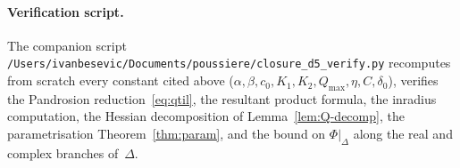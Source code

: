 \documentclass[11pt,a4paper]{article}
\begin{document}
\paragraph{Verification script.}
The companion script
\verb|/Users/ivanbesevic/Documents/poussiere/closure_d5_verify.py|
recomputes from scratch every constant cited above
($\alpha, \beta, c_0, K_1, K_2, Q_{\max}, \eta, C, \delta_0$),
verifies the Pandrosion reduction~\eqref{eq:qtil}, the resultant
product formula, the inradius computation, the Hessian decomposition
of Lemma~\ref{lem:Q-decomp}, the parametrisation
Theorem~\ref{thm:param}, and the bound on $\Phi|_\Delta$ along the
real and complex branches of~$\Delta$.
\end{document}
